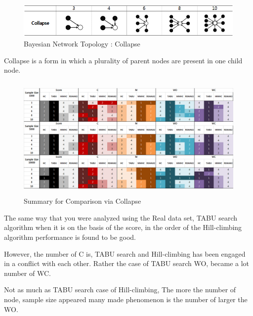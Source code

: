 	\begin{figure}[!bhp]
	\centering
		\includegraphics[height=50pt]{Topologies_Collapse}
		\caption{Bayesian Network Topology : Collapse}
	\end{figure}	

	Collapse is a form in which a plurality of parent nodes are present in one child node.

	\begin{figure}[!bhp]
	\centering
		\includegraphics[height=170pt]{Result_Collapse}
		\caption{Summary for Comparison via Collapse}
	\end{figure}	
	
The same way that you were analyzed using the Real data set, TABU search algorithm when it is on the basis of the score, in the order of the Hill-climbing algorithm performance is found to be good.

However, the number of C is, TABU search and Hill-climbing has been engaged in a conflict with each other. Rather the case of TABU search WO, became a lot number of WC.

Not as much as TABU search case of Hill-climbing, The more the number of node, sample size appeared many made phenomenon is the number of larger the WO.

